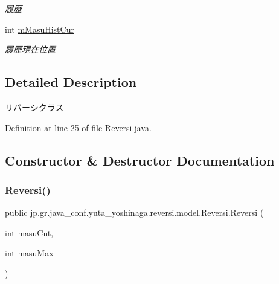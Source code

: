 \begin{DoxyCompactItemize}
\begin{DoxyCompactList}\small\item\em 履歴 \end{DoxyCompactList}\item 
\mbox{\label{classjp_1_1gr_1_1java__conf_1_1yuta__yoshinaga_1_1reversi_1_1model_1_1_reversi_aaedf62ec913875540109bfbe01bb1969}} 
int \hyperlink{classjp_1_1gr_1_1java__conf_1_1yuta__yoshinaga_1_1reversi_1_1model_1_1_reversi_aaedf62ec913875540109bfbe01bb1969}{m\+Masu\+Hist\+Cur}
\begin{DoxyCompactList}\small\item\em 履歴現在位置 \end{DoxyCompactList}\end{DoxyCompactItemize}


\subsection{Detailed Description}
リバーシクラス 

Definition at line 25 of file Reversi.\+java.



\subsection{Constructor \& Destructor Documentation}
\mbox{\label{classjp_1_1gr_1_1java__conf_1_1yuta__yoshinaga_1_1reversi_1_1model_1_1_reversi_a22abbc9c1a2016388dafb08dc9a7b820}} 
\subsubsection{\texorpdfstring{Reversi()}{Reversi()}\hspace{0.1cm}{\footnotesize\ttfamily [1/2]}}
{\footnotesize\ttfamily public jp.\+gr.\+java\+\_\+conf.\+yuta\+\_\+yoshinaga.\+reversi.\+model.\+Reversi.\+Reversi (\begin{DoxyParamCaption}\item[{int}]{masu\+Cnt,  }\item[{int}]{masu\+Max }\end{DoxyParamCaption})}



